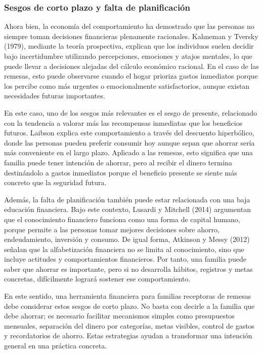 \documentclass[12pt,letterpaper]{article}
\begin{document}
\subsubsection{\texorpdfstring{\textbf{Sesgos de corto plazo y falta de planificación}}{Sesgos de corto plazo y falta de planificación}}\label{sesgos-de-corto-plazo-y-falta-de-planificaciuxf3n}

Ahora bien, la economía del comportamiento ha demostrado que las personas no siempre toman decisiones financieras plenamente racionales. Kahneman y Tversky (1979), mediante la teoría prospectiva, explican que los individuos suelen decidir bajo incertidumbre utilizando percepciones, emociones y atajos mentales, lo que puede llevar a decisiones alejadas del cálculo económico racional. En el caso de las remesas, esto puede observarse cuando el hogar prioriza gastos inmediatos porque los percibe como más urgentes o emocionalmente satisfactorios, aunque existan necesidades futuras importantes.

En este caso, uno de los sesgos más relevantes es el sesgo de presente, relacionado con la tendencia a valorar más las recompensas inmediatas que los beneficios futuros. Laibson explica este comportamiento a través del descuento hiperbólico, donde las personas pueden preferir consumir hoy aunque sepan que ahorrar sería más conveniente en el largo plazo. Aplicado a las remesas, esto significa que una familia puede tener intención de ahorrar, pero al recibir el dinero termina destinándolo a gastos inmediatos porque el beneficio presente se siente más concreto que la seguridad futura.

Además, la falta de planificación también puede estar relacionada con una baja educación financiera. Bajo este contexto, Lusardi y Mitchell (2014) argumentan que el conocimiento financiero funciona como una forma de capital humano, porque permite a las personas tomar mejores decisiones sobre ahorro, endeudamiento, inversión y consumo. De igual forma, Atkinson y Messy (2012) señalan que la alfabetización financiera no se limita al conocimiento, sino que incluye actitudes y comportamientos financieros. Por tanto, una familia puede saber que ahorrar es importante, pero si no desarrolla hábitos, registros y metas concretas, difícilmente logrará sostener ese comportamiento.

En este sentido, una herramienta financiera para familias receptoras de remesas debe considerar estos sesgos de corto plazo. No basta con decirle a la familia que debe ahorrar; es necesario facilitar mecanismos simples como presupuestos mensuales, separación del dinero por categorías, metas visibles, control de gastos y recordatorios de ahorro. Estas estrategias ayudan a transformar una intención general en una práctica concreta.
\end{document}
